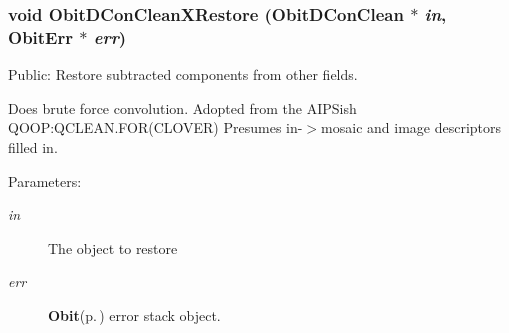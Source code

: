 \subsubsection{\setlength{\rightskip}{0pt plus 5cm}void Obit\-DCon\-Clean\-XRestore ({\bf Obit\-DCon\-Clean} $\ast$ {\em in}, {\bf Obit\-Err} $\ast$ {\em err})}\label{ObitDConClean_8c_a26}


Public: Restore subtracted components from other fields. 

Does brute force convolution. Adopted from the AIPSish QOOP:QCLEAN.FOR(CLOVER) Presumes in-$>$mosaic and image descriptors filled in. \begin{Desc}
\item[Parameters:]
\begin{description}
\item[{\em in}]The object to restore \item[{\em err}]{\bf Obit}{\rm (p.\,\pageref{structObit})} error stack object. \end{description}
\end{Desc}
